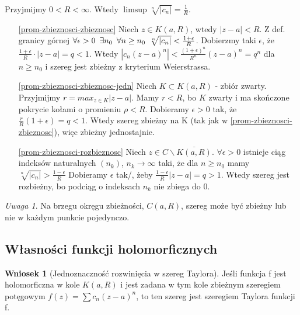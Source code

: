\documentclass[11pt]{article}
\newcommand{\abs}[1]{\left|#1\right|} %
\newcommand{\closure}[1]{\overline{#1}} %
\theoremstyle{plain}
\theoremstyle{definition}
\newtheorem*{corollary}{Wniosek}
\theoremstyle{remark}
\newtheorem*{remark}{Uwaga}
\let\oldendproof\endproof
\renewenvironment{proof}[1][\proofname]{
  \oldproof[\textsc{\small #1}]
}{\oldendproof}
\begin{document}
\begin{proof}
  Przyjmijmy $ 0 < R < \infty $. Wtedy $ \limsup \sqrt[n]{\abs{c_n}} = \frac{1}{R} $.

  \begin{enumerate}
    \item[\ref{prom-zbieznosci-zbieznosc}]
    Niech $ z \in K(a, R) $, wtedy $ \abs{z-a} < R $. Z def. granicy górnej 
    $ \forall \epsilon > 0 \enskip \exists n_0 \enskip \forall n \geq n_0 \enskip \sqrt[n]{\abs{c_n}} < \frac{1+\epsilon}{R} $.
    Dobierzmy taki $ \epsilon $, że $ \frac{1+\epsilon}{R} \cdot \abs{z-a} = q < 1 $.
    Wtedy $ \abs{ c_n(z-a)^n } < \frac{(1+\epsilon)^n}{R^n}(z-a)^n = q^n $ dla $ n \geq n_0 $ i szereg jest zbieżny z kryterium Weierstrassa.

    \item[\ref{prom-zbieznosci-zbieznosc-jedn}]
    Niech $ K \subset K(a, R) $ - zbiór zwarty.
    Przyjmijmy $ r = max_{z \in K}\abs{z-a} $.
    Mamy $ r < R $, bo $ K $ zwarty i ma skończone pokrycie kołami o promieniu $ \rho < R $.
    Dobieramy $ \epsilon > 0 $ tak, że $ \frac{r}{R}(1+\epsilon) = q < 1 $.
    Wtedy szereg zbieżny na K (tak jak w \ref{prom-zbieznosci-zbieznosc}), więc zbieżny jednostajnie.

    \item[\ref{prom-zbieznosci-rozbieznosc}]
    Niech $ z \in C \backslash \closure{K(a, R)} $.
    $ \forall \epsilon > 0 $ istnieje ciąg indeksów naturalnych $ (n_k) $, $ n_k \to \infty $ taki, że dla $ n \geq n_0 $ mamy $ \sqrt[n]{\abs{c_n}} > \frac{1-\epsilon}{R} $
    Dobieramy $ \epsilon $ tak/, żeby $ \frac{1-\epsilon}{R}\abs{z-a} = q > 1 $.
    Wtedy szereg jest rozbieżny, bo podciąg o indeksach $ n_k $ nie zbiega do $ 0 $.
  \end{enumerate}
\end{proof}

\begin{remark}
  Na brzegu okręgu zbieżności, $ C(a, R) $, szereg może być zbieżny lub nie w każdym punkcie pojedynczo.
\end{remark}

\subsection{Własności funkcji holomorficznych}

\begin{corollary}[Jednoznaczność rozwinięcia w szereg Taylora]
  Jeśli funkcja f jest holomorficzna w kole $ K(a, R) $ i jest zadana w tym kole zbieżnym szeregiem potęgowym $ f(z) = \sum c_n(z-a)^n $, to ten szereg jest szeregiem Taylora funkcji f.
\end{corollary}
\end{document}
